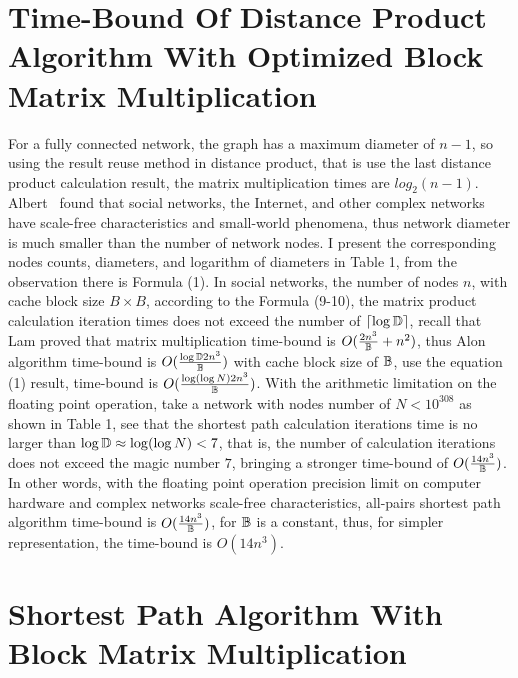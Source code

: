 \documentclass[review]{cvpr}
\begin{document}

\section{Time-Bound Of Distance Product Algorithm With Optimized Block Matrix Multiplication}

For a fully connected network, the graph has a maximum diameter of $n-1$, so using the result reuse method in distance product, that is use the last distance product calculation result, the matrix multiplication times are $log_2(n-1)$.
Albert~\cite{albert1999diameter} found that social networks, the Internet, and other complex networks have scale-free characteristics and small-world phenomena, thus network diameter is much smaller than the number of network nodes.
I present the corresponding nodes counts, diameters, and logarithm of diameters in Table 1, from the observation there is Formula (1).
In social networks, the number of nodes $n$, with cache block size $B\times B$, according to the Formula (9-10), the matrix product calculation iteration times does not exceed the number of $\lceil{\log{\Bbb D}}\rceil$, recall that Lam \etal proved that matrix multiplication time-bound is \(O({2n^3 \over \Bbb B}+{n^2})\),
thus Alon \etal algorithm time-bound is \(O({\log{\Bbb D}2n^3\over{ \Bbb B}})\) with cache block size of $\Bbb B$, use the equation (1) result, time-bound is \(O({\log(\log{N})2n^3\over \Bbb B})\).
With the arithmetic limitation on the floating point operation, \eg take a network with nodes number of $N<10^{308}$
as shown in Table 1, see that the shortest path calculation iterations time is no larger than $\log{\Bbb D} \approx \log(\log{N})<7$, that is, the number of calculation iterations does not exceed the magic number $7$,
bringing a stronger time-bound of \(O({14n^3\over {\Bbb B}})\).
In other words, with the floating point operation precision limit on computer hardware and complex networks scale-free characteristics, all-pairs shortest path algorithm time-bound is \(O({14n^3\over \Bbb B})\), for $\Bbb B$ is a constant, thus, for simpler representation, the time-bound is \(O(14n^3)\).




\section{Shortest Path Algorithm With Block Matrix Multiplication}
\end{document}
